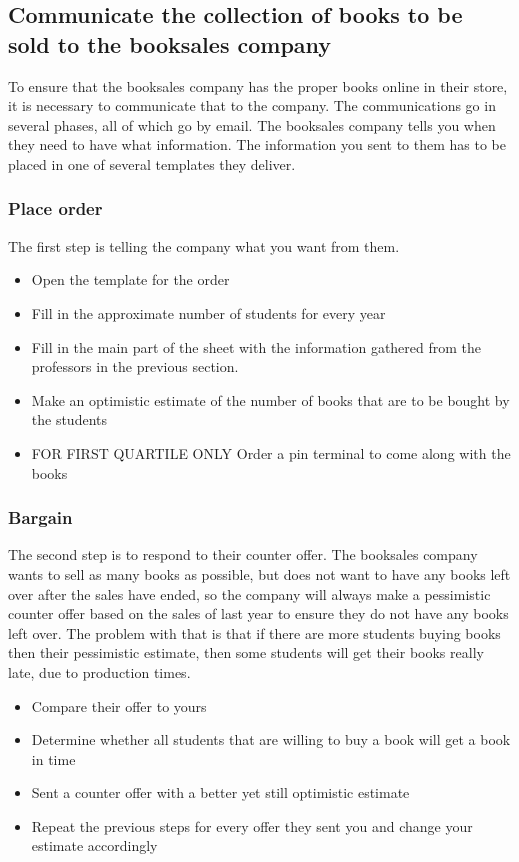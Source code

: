 \documentclass{article}
\begin{document}
\subsection*{Communicate the collection of books to be sold to the booksales company}
To ensure that the booksales company has the proper books online in their store, it is necessary to communicate that to the company. The communications go in several phases, all of which go by email. The booksales company tells you when they need to have what information. The information you sent to them has to be placed in one of several templates they deliver. 

\subsubsection*{Place order}
The first step is telling the company what you want from them.

\begin{itemize} 
\vspace{-1mm}
\itemsep-1mm 
\item Open the template for the order
\item Fill in the approximate number of students for every year
\item Fill in the main part of the sheet with the information gathered from the professors in the previous section.
\item Make an optimistic estimate of the number of books that are to be bought by the students
\item FOR FIRST QUARTILE ONLY Order a pin terminal to come along with the books
\end{itemize}

\subsubsection*{Bargain}
The second step is to respond to their counter offer. The booksales company wants to sell as many books as possible, but does not want to have any books left over after the sales have ended, so the company will always make a pessimistic counter offer based on the sales of last year to ensure they do not have any books left over. The problem with that is that if there are more students buying books then their pessimistic estimate, then some students will get their books really late, due to production times.

\begin{itemize} 
\vspace{-1mm}
\itemsep-1mm 
\item Compare their offer to yours
\item Determine whether all students that are willing to buy a book will get a book in time
\item Sent a counter offer with a better yet still optimistic estimate
\item Repeat the previous steps for every offer they sent you and change your estimate accordingly
\end{itemize}
\end{document}

